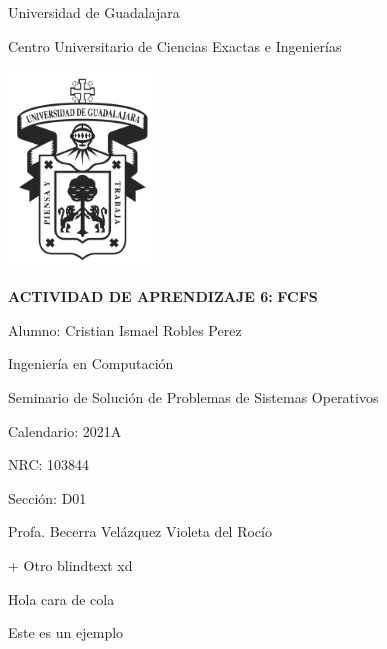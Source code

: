 \documentclass[12pt, oneside]{article}
\title{\tiText}
\newcommand{\actTitle}{FCFS}
\newcommand{\calendar}{2021A}
\newcommand{\nrc}{103844}
\newcommand{\signSec}{D01}
\newcommand{\profName}{Profa. Becerra Velázquez Violeta del Rocío}
\newcommand{\actNum}{ACTIVIDAD DE APRENDIZAJE 6: }
\newcommand{\myName}{Cristian Ismael Robles Perez}
\newcommand{\sign}{Seminario de Solución de Problemas de Sistemas Operativos}
\begin{document}

\begingroup
    \fontsize{18pt}{22pt}\selectfont
    \begin{center}
        Universidad de Guadalajara

        Centro Universitario de Ciencias Exactas e Ingenierías

        \includegraphics[width=150px]{imgs/logo_udg.png}

        \textbf{\actNum}
        \textbf{\actTitle}
    \end{center}
\endgroup

\begingroup
    \fontsize{16pt}{18pt}\selectfont
    Alumno: \myName

    Ingeniería en Computación

    \sign

    Calendario: \calendar

    NRC: \nrc

    Sección: \signSec

    \profName
\endgroup


\newpage

\blindtext
\blindtext
\blindtext
\newpage

\blindtext
\blindtext
\blindtext
\blindtext
\blindtext
\blindtext
\blindtext

\blindtext
\blindtext

\blindtext

\blindtext
+
Otro blindtext xd

\blindtext

Hola cara de cola

\blindtext

Este es un ejemplo

\blindtext
\end{document}
